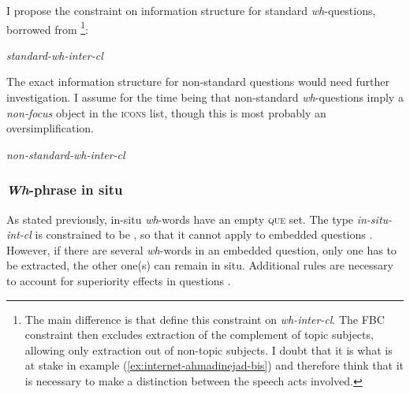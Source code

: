 I propose the constraint  on information structure for standard \emph{wh}-questions, borrowed from \citet[117]{Winckel.2020}\footnote{The main difference is that  \citeauthor{Winckel.2020} define this constraint on \emph{wh-inter-cl}. The FBC constraint then excludes extraction of the complement of topic subjects, allowing only extraction out of non-topic subjects. I doubt that it is what is at stake in example (\ref{ex:internet-ahmadinejad-bis}) and therefore think that it is necessary to make a distinction between the speech acts involved.}:\largerpage[2.25]

\ea 
\textit{standard-wh-inter-cl} \avm{$\to$}\nopagebreak

\label{avm:standard-wh-inter-cl}
\z 

The exact information structure for non-standard questions would need further investigation. I assume for the time being that non-standard \emph{wh}-questions imply a \emph{non-focus} object in the \textsc{icons} list, though this is most probably an oversimplification.

\ea 
\textit{non-standard-wh-inter-cl} \avm{$\to$}\nopagebreak

\z

\subsubsection{\emph{Wh}-phrase in situ}

As stated previously, in-situ \emph{wh}-words have an empty \textsc{que} set. The type \textit{in-situ-int-cl} is constrained to be \avm{[mc & \normalfont{+}]}, so that it cannot apply to embedded questions \citep[271]{Ginzburg.2000}. However, if there are several \emph{wh}-words in an embedded question, only one has to be extracted, the other one(s) can remain in situ. Additional rules are necessary to account for superiority effects in questions \citep[247--254]{Ginzburg.2000}.


